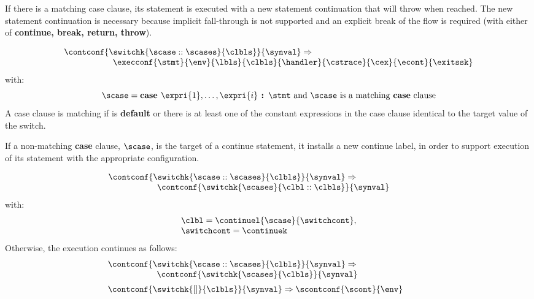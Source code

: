 \documentclass{article}
\begin{document}
If there is a matching case clause, its statement is executed with a new statement continuation that will throw when reached. The new statement continuation is necessary because implicit fall-through is not supported and an explicit break of the flow is required (with either of \textbf{continue, break, return, throw}).

\[
  \begin{array}{lcl}
	\contconf{\switchk{\scase :: \scases}{\clbls}}{\synval}
	\Rightarrow \hspace{30mm}\\
	\hspace{20mm}\execconf{\stmt}{\env}{\lbls}{\clbls}{\handler}{\cstrace}{\cex}{\econt}{\exitssk}
  \end{array}
\]
with:
\[
	\scase = \textbf{case } \expri{1}, \dots, \expri{i} \textbf{ : } \stmt \textrm{ and } \scase \textrm{ is a matching \textbf{case} clause}
\]
A case clause is matching if is \textbf{default} or there is at least one of the constant expressions in the case clause identical to the target value of the switch.

\noindent
If a non-matching \textbf{case} clause, $\scase$, is the target of a continue statement, it installs a new continue label, in order to support execution of its statement with the appropriate configuration.

\[
  \begin{array}{lcl}
	\contconf{\switchk{\scase :: \scases}{\clbls}}{\synval}
	\Rightarrow \hspace{30mm}\\
	\hspace{20mm}\contconf{\switchk{\scases}{\clbl :: \clbls}}{\synval}
  \end{array}
\]
with:
\[
  \begin{array}{l}
	\clbl = \continuel{\scase}{\switchcont},\\
	\switchcont = \continuek
  \end{array}
\]
\noindent
Otherwise, the execution continues as follows:
\[
  \begin{array}{lcl}
    \contconf{\switchk{\scase :: \scases}{\clbls}}{\synval}
	\Rightarrow \hspace{30mm}\\
	\hspace{20mm}\contconf{\switchk{\scases}{\clbls}}{\synval}\\[2mm]

	\contconf{\switchk{[]}{\clbls}}{\synval}
	\Rightarrow
	\scontconf{\scont}{\env}
  \end{array}
\]
\end{document}
